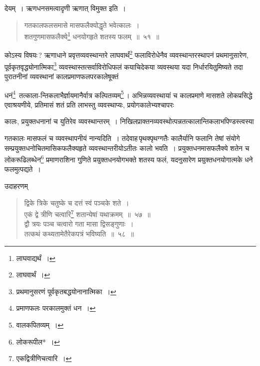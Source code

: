 \documentclass[10pt, openany]{book}
\begin{document}
{{{{{{देयम्~।}
{ऋणधनसमत्वादृणी ऋणात् विमुक्त इति~।}

\vspace{0.2cm}{करणसूत्रमार्या\textemdash}

\begin{quote}
    
{\bs  गतकालफलसमासे मासफलैक्योद्धृते भवेत्कालः~। \\
 शतगुणमासफलैक्ये\renewcommand{\thefootnote}{\s ७}\footnote{\s लाघवाद्यर्थं~।} धनयोगहृते शतस्य फलम्~॥~५१~॥}\end{quote}

{कोऽस्य विषयः\,? ऋणाधाने प्रवृत्तव्यवस्थान्तरे लाघवार्थं\renewcommand{\thefootnote}{\s ८}\footnote{\s लाघवार्थं~।}
फलाविरोधेनैव व्यवस्थान्तरस्थापनं प्रथमानुसारेण, पूर्वकृतवृद्ध्योनात्मिका\renewcommand{\thefootnote}{\s ९}\footnote{\s प्रथमानुसरणं पूर्वकृतबद्धयोनानात्मिका~।}
व्यवस्थास्तत्सर्वाविरोधिफलं कयाचिदेकया}
{व्यवस्थया यदा निर्धारयितुमिष्यते तदा पुरातनीनां व्यवस्थानां
कालप्रमाणफलपरकालेषूक्तं}} धनं\renewcommand{\thefootnote}{\s १०}\footnote{\s प्रमाणफलः परकालमुक्तं धन~।}~तत्काला-न्तिकलाभैर्ज्ञायमानैर्वात्र कल्पितव्यम्\renewcommand{\thefootnote}{\s ११}\footnote{\s वालकपितव्यम्~।}\,।
अभिन्नव्यवस्थायां च कालप्रमाणे मासशते लोकप्रसिद्धे एवाश्रयणीये, प्रतिमासं शतं प्रति लाभस्तु व्यवस्थाप्यः,
प्रयोगकालेभ्यश्चापरः}
{कालः, प्रयुक्तधनानां च युतिरेव व्यवस्थान्तरम्~।
निखिलप्राक्तनव्यवस्थोत्पन्नतत्कालान्तिकलाभपिण्डस्त्वस्या}


\newpage

{गतकालः मासफलं च व्यवस्थापनीयं नान्यदिति~। तदेवाह\textendash \,पृथक्पृथग्गतैः
कालैर्यानि}
{फलानि तेषां संयोगे सम्प्रयुक्तधनोचितमासिकफलैक्यहृते व्यवस्थान्तरीयोऽतीतः
कालो}
{भवति~। प्रयुक्तधनमासफलैक्ये शतेन च लोकरूढिलब्धेन\renewcommand{\thefootnote}{\s १}\footnote{\s लोकरूपील*~।} प्रमाणराशिना
गुणिते प्रयुक्तधनयोगभक्ते शतस्य फलं, यदनुसारेण प्रयुक्तधनयोगात्मके धने फलमुत्पद्यते~।}
\vspace{3mm}

{उदाहरणम्\textemdash}

\begin{quote}
    
{\eg द्विके त्रिके चतुष्के च दत्तं स्वं पञ्चके शते~। \\
 एकं द्वे त्रीणि चत्वारि\renewcommand{\thefootnote}{\s २}\footnote{\s एकद्वित्रीणिचत्वारि~।} शतान्येषां यथाक्रमम्~॥~५७~॥ \\
 द्वौ त्रयः पञ्च चत्वारो गता मासा द्विसङ्गुणाः~। \\
 तत्कथं कथ्यतामेतैरेकपत्रं भविष्यति~॥~५८~॥} \end{quote}

}}}
\end{document}
